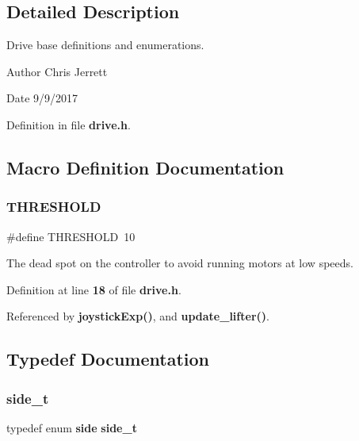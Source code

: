 \subsection{Detailed Description}
Drive base definitions and enumerations. 

\begin{DoxyAuthor}{Author}
Chris Jerrett 
\end{DoxyAuthor}
\begin{DoxyDate}{Date}
9/9/2017 
\end{DoxyDate}


Definition in file \textbf{ drive.\+h}.



\subsection{Macro Definition Documentation}
\mbox{\label{drive_8h_a4679d8ea8690999a6c6c7c0cb245c879}} 
\subsubsection{T\+H\+R\+E\+S\+H\+O\+LD}
{\footnotesize\ttfamily \#define T\+H\+R\+E\+S\+H\+O\+LD~10}



The dead spot on the controller to avoid running motors at low speeds. 



Definition at line \textbf{ 18} of file \textbf{ drive.\+h}.



Referenced by \textbf{ joystick\+Exp()}, and \textbf{ update\+\_\+lifter()}.



\subsection{Typedef Documentation}
\mbox{\label{drive_8h_a9df2afd2f1acb97019655e5e730609c7}} 
\subsubsection{side\+\_\+t}
{\footnotesize\ttfamily typedef enum \textbf{ side}  \textbf{ side\+\_\+t}}



